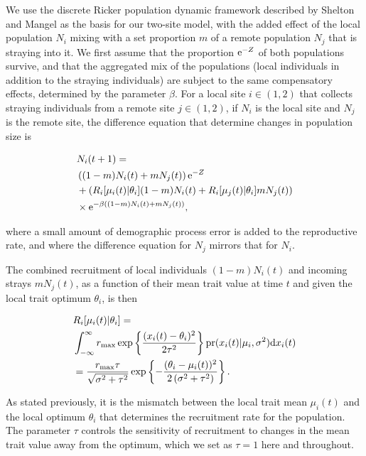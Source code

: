 \documentclass[twocolumn,preprintnumbers,amsmath,amssymb,superscriptaddress]{revtex4}
\begin{document}
We use the discrete Ricker population dynamic framework described by Shelton and Mangel \cite{} as the basis for our two-site model, with the added effect of the local population $N_i$ mixing with a set proportion $m$ of a remote population $N_j$ that is straying into it.
We first assume that the proportion ${\rm e}^{-Z}$ of both populations survive, and that the aggregated mix of the populations (local individuals in addition to the straying individuals) are subject to the same compensatory effects, determined by the parameter $\beta$.
For a local site $i\in(1,2)$ that collects straying individuals from a remote site $j\in(1,2)$, if $N_i$ is the local site and $N_j$ is the remote site, the difference equation that determine changes in population size is

\begin{align}
  &N_i(t+1) = \\ \nonumber
  &\left((1-m)N_i(t) + m N_j(t) \right){\rm e}^{-Z} \\ \nonumber
  &+ \left(R_i[\mu_i(t)|\theta_i] (1-m)N_i(t) + R_i[\mu_j(t)|\theta_i] m N_j(t)\right) \\ \nonumber
  &\times {\rm e}^{-\beta ((1-m)N_i(t) + m N_j(t))},
  \label{eq:N}
\end{align}

\noindent where a small amount of demographic process error is added to the reproductive rate, and where the difference equation for $N_j$ mirrors that for $N_i$.

The combined recruitment of local individuals $(1-m)N_i(t)$ and incoming strays $mN_j(t)$, as a function of their mean trait value at time $t$ and given the local trait optimum $\theta_i$, is then

\begin{align}
  &R_i[\mu_i(t)|\theta_i] = \\ \nonumber
  &\int_{-\infty}^\infty r_{\rm max}\exp\left\{\frac{(x_i(t)-\theta_i)^2}{2\tau^2}\right\} {\rm pr}(x_i(t)|\mu_i,\sigma^2) {\rm d}x_i(t) \\ \nonumber
  &= \frac{r_{\rm max} \tau  }{\sqrt{\sigma ^2+\tau ^2}}\exp\left\{-\frac{(\theta_i-\mu_i(t))^2}{2 \left(\sigma ^2+\tau ^2\right)}\right\}.
  \label{eq:R}
\end{align}

\noindent As stated previously, it is the mismatch between the local trait mean $\mu_i(t)$ and the local optimum $\theta_i$ that determines the recruitment rate for the population.
The parameter $\tau$ controls the sensitivity of recruitment to changes in the mean trait value away from the optimum, which we set as $\tau=1$ here and throughout.
\end{document}
